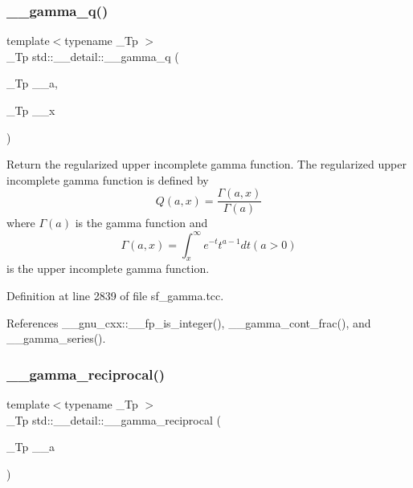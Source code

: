 \subsubsection{\texorpdfstring{\+\_\+\+\_\+gamma\+\_\+q()}{\_\_gamma\_q()}\hspace{0.1cm}{\footnotesize\ttfamily [2/2]}}
{\footnotesize\ttfamily template$<$typename \+\_\+\+Tp $>$ \\
\+\_\+\+Tp std\+::\+\_\+\+\_\+detail\+::\+\_\+\+\_\+gamma\+\_\+q (\begin{DoxyParamCaption}\item[{\+\_\+\+Tp}]{\+\_\+\+\_\+a,  }\item[{\+\_\+\+Tp}]{\+\_\+\+\_\+x }\end{DoxyParamCaption})}



Return the regularized upper incomplete gamma function. The regularized upper incomplete gamma function is defined by \[ Q(a,x) = \frac{\Gamma(a,x)}{\Gamma(a)} \] where $ \Gamma(a) $ is the gamma function and \[ \Gamma(a,x) = \int_x^\infty e^{-t}t^{a-1}dt (a > 0) \] is the upper incomplete gamma function. 



Definition at line 2839 of file sf\+\_\+gamma.\+tcc.



References \+\_\+\+\_\+gnu\+\_\+cxx\+::\+\_\+\+\_\+fp\+\_\+is\+\_\+integer(), \+\_\+\+\_\+gamma\+\_\+cont\+\_\+frac(), and \+\_\+\+\_\+gamma\+\_\+series().

\mbox{\label{namespacestd_1_1____detail_a8ac187fda39e0c55614e4c58146f871c}} 
\subsubsection{\texorpdfstring{\+\_\+\+\_\+gamma\+\_\+reciprocal()}{\_\_gamma\_reciprocal()}}
{\footnotesize\ttfamily template$<$typename \+\_\+\+Tp $>$ \\
\+\_\+\+Tp std\+::\+\_\+\+\_\+detail\+::\+\_\+\+\_\+gamma\+\_\+reciprocal (\begin{DoxyParamCaption}\item[{\+\_\+\+Tp}]{\+\_\+\+\_\+a }\end{DoxyParamCaption})}

